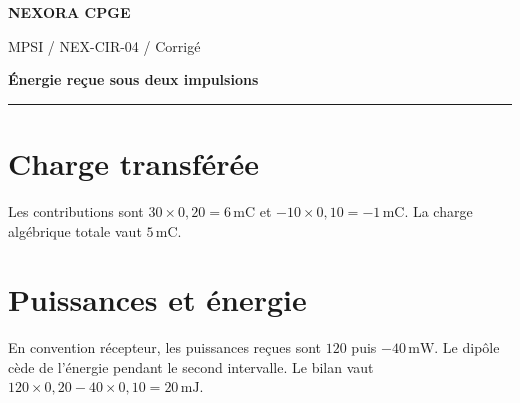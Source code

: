 \documentclass[11pt,a4paper]{article}
\begin{document}
{\small\bfseries\color{nexorablue} NEXORA CPGE}\par
{\small MPSI / NEX-CIR-04 / Corrigé}\par
{\LARGE\bfseries Énergie reçue sous deux impulsions}\par
\vspace{0.25em}\hrule\vspace{0.6em}

\section*{Charge transférée}
Les contributions sont $30\times0{,}20=6\,\mathrm{mC}$ et $-10\times0{,}10=-1\,\mathrm{mC}$. La charge algébrique totale vaut $5\,\mathrm{mC}$.

\section*{Puissances et énergie}
En convention récepteur, les puissances reçues sont $120$ puis $-40\,\mathrm{mW}$. Le dipôle cède de l’énergie pendant le second intervalle. Le bilan vaut $120\times0{,}20-40\times0{,}10=20\,\mathrm{mJ}$.
\end{document}
